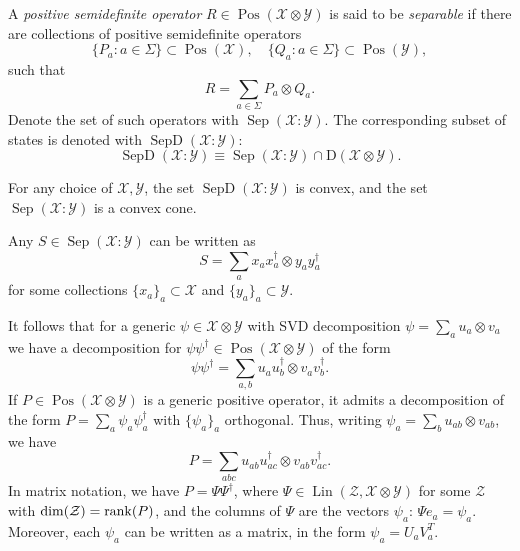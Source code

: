 \documentclass[12pt]{report}
\newcommand{\on}[1]{\operatorname{#1}}
\newcommand{\calY}{{\mathcal{Y}}}
\newcommand{\calX}{{\mathcal{X}}}
\newcommand{\calZ}{{\mathcal{Z}}}
\newcommand{\rmD}{{\mathrm{D}}}
\DeclareMathOperator{\Pos}{Pos}
\DeclareMathOperator{\Lin}{Lin}
\begin{document}
\begin{defn}
	A \emph{positive semidefinite operator} $R\in\Pos(\calX\otimes\calY)$ is said to be \emph{separable} if there are collections of positive semidefinite operators
	\begin{equation}
		\{P_a : a \in\Sigma\} \subset\Pos(\calX),
		\quad
		\{Q_a : a \in\Sigma\} \subset\Pos(\calY),
	\end{equation}
	such that
	\begin{equation}
		R = \sum_{a\in\Sigma} P_a \otimes Q_a.
	\end{equation}
	Denote the set of such operators with $\on{Sep}(\calX:\calY)$.
	The corresponding subset of states is denoted with $\on{SepD}(\calX:\calY)$:
	\begin{equation}
		\on{SepD}(\calX:\calY) \equiv \on{Sep}(\calX:\calY)\cap \rmD(\calX\otimes\calY).
	\end{equation}
\end{defn}

\begin{prop}
	For any choice of $\calX,\calY$, the set
	$\on{SepD}(\calX:\calY)$ is convex, and the set
	$\on{Sep}(\calX:\calY)$ is a convex cone.
\end{prop}

\begin{prop}
	Any $S\in\on{Sep}(\calX:\calY)$ can be written as
	\begin{equation}
		S = \sum_a x_a x_a^\dagger\otimes y_a y_a^\dagger
	\end{equation}
	for some collections $\{x_a\}_a\subset\calX$ and $\{y_a\}_a\subset\calY$.
\end{prop}

It follows that for a generic $\psi\in\calX\otimes\calY$ with SVD decomposition
$\psi=\sum_a u_a\otimes v_a$ we have a decomposition for $\psi\psi^\dagger\in\Pos(\calX\otimes\calY)$ of the form
\begin{equation}
	\psi\psi^\dagger = \sum_{a,b} u_a u_b^\dagger \otimes v_a v_b^\dagger.
\end{equation}
If $P\in\Pos(\calX\otimes\calY)$ is a generic positive operator, it admits a decomposition of the form $P=\sum_a \psi_a\psi_a^\dagger$ with $\{\psi_a\}_a$ orthogonal.
Thus, writing $\psi_a=\sum_b u_{ab}\otimes v_{ab}$, we have
\begin{equation}
	P = \sum_{abc} u_{ab}u_{ac}^\dagger \otimes v_{ab}v_{ac}^\dagger.
\end{equation}
In matrix notation, we have $P=\Psi\Psi^\dagger$, where
$\Psi\in\Lin(\calZ,\calX\otimes\calY)$ for some $\calZ$ with $\dim(\calZ)=\rank(P)$,
and the columns of $\Psi$ are the vectors $\psi_a$:
$\Psi e_a=\psi_a$.
Moreover, each $\psi_a$ can be written as a matrix, in the form $\psi_a=U_a V_a^T$.
\end{document}
